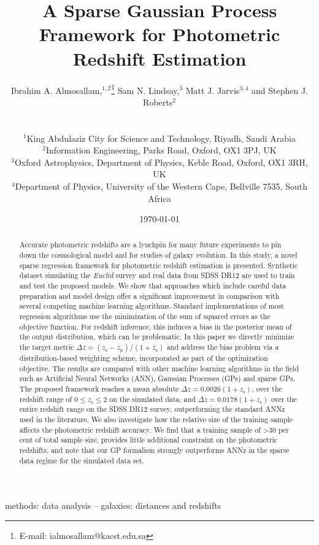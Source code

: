 \documentclass[useAMS,usenatbib,fleqn]{mn2e}
\title[A Sparse GP Framework for Photometric Redshift]{A Sparse Gaussian Process Framework for Photometric Redshift Estimation}
\author[Almosallam et al.]
{\parbox{\textwidth}{Ibrahim A. Almosallam,$^{1,2}$\thanks{E-mail: ialmosallam@kacst.edu.sa} Sam N. Lindsay,$^{3}$ Matt J. Jarvis$^{3,4}$ and Stephen J. Roberts$^{2}$
}
\vspace{0.4cm}\\
\parbox{\textwidth}{
$^1$King Abdulaziz City for Science and Technology, Riyadh, Saudi Arabia\\
$^2$Information Engineering, Parks Road, Oxford, OX1 3PJ, UK\\
$^3$Oxford Astrophysics, Department of Physics, Keble Road, Oxford, OX1 3RH, UK\\
$^4$Department of Physics, University of the Western Cape, Bellville 7535, South Africa\\
}}
\begin{document}
\date{\today}

\pagerange{\pageref{firstpage}--\pageref{lastpage}} 

\maketitle

\label{firstpage}

\begin{abstract}
Accurate photometric redshifts are a lynchpin for many future experiments to pin down the cosmological model and for studies of galaxy evolution. In this study, a novel sparse regression framework for photometric redshift estimation is presented. Synthetic dataset simulating the {\em Euclid} survey and real data from SDSS DR12 are used to train and test the proposed models. We show that approaches which include careful data preparation and model design offer a significant improvement in comparison with several competing machine learning algorithms. Standard implementations of most regression algorithms use the minimization of the sum of squared errors as the objective function. For redshift inference, this induces a bias in the posterior mean of the output distribution, which can be problematic. In this paper we directly minimize the target metric $\Delta z = (z_\textrm{s} - z_\textrm{p})/(1+z_\textrm{s})$ and address the bias problem via a distribution-based weighting scheme, incorporated as part of the optimization objective. The results are compared with other machine learning algorithms in the field such as Artificial Neural Networks (ANN), Gaussian Processes (GPs) and sparse GPs. The proposed framework reaches a mean absolute $\Delta z = 0.0026(1+z_\textrm{s})$, over the redshift range of $0 \le z_\textrm{s} \le 2$ on the simulated data, and $\Delta z = 0.0178(1+z_\textrm{s})$ over the entire redshift range on the SDSS DR12 survey, outperforming the standard {\sc ANNz} used in the literature. We also investigate how the relative size of the training sample affects the photometric redshift accuracy. We find that a training sample of \textgreater 30 per cent of total sample size, provides little additional constraint on the photometric redshifts, and note that our GP formalism strongly outperforms {\sc ANNz} in the sparse data regime for the simulated data set.

\end{abstract}

\begin{keywords}
methods: data analysis -- galaxies: distances and redshifts
\end{keywords}
\end{document}
